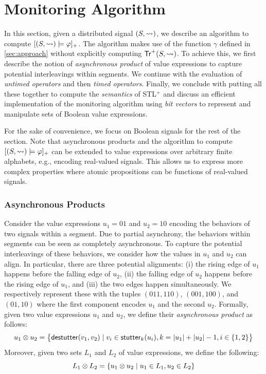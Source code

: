 \section{Monitoring Algorithm} \label{sec:algorithm}
In this section, given a distributed signal $(S,{\rightsquigarrow})$, we describe an algorithm to compute $[(S,{\rightsquigarrow}) \models \varphi]_+$.
The algorithm makes use of the function $\gamma$ defined in \cref{sec:approach} without explicitly computing $\mathsf{Tr}^+(S,{\rightsquigarrow})$.
To achieve this, we first describe the notion of \emph{asynchronous product} of value expressions to capture potential interleavings within segments.
We continue with the evaluation of \emph{untimed operators} and then \emph{timed operators}.
Finally, we conclude with putting all these together to compute the \emph{semantics} of STL$^+$ 
and discuss an efficient implementation of the monitoring algorithm using \emph{bit vectors} to 
represent and manipulate sets of Boolean value expressions.

\begin{remark}
	For the sake of convenience, we focus on Boolean signals for the rest of the section.
	Note that asynchronous products and the algorithm to compute $[(S,{\rightsquigarrow}) \models \varphi]_+$ can be extended to value expressions over arbitrary finite alphabets, e.g., encoding real-valued signals.
	This allows us to express more complex properties where atomic propositions can be functions of real-valued signals.
\end{remark}

\subsubsection{Asynchronous Products}
Consider the value expressions $u_1 = 01$ and $u_2 = 10$ encoding the behaviors of two signals within a segment.
Due to partial asynchrony, the behaviors within segments can be seen as completely asynchronous.
To capture the potential interleavings of these behaviors, we consider how the values in $u_1$ and $u_2$ can align.
In particular, there are three potential alignments:
(i) the rising edge of $u_1$ happens before the falling edge of $u_2$,
(ii) the falling edge of $u_2$ happens before the rising edge of $u_1$, and
(iii) the two edges happen simultaneously.
We respectively represent these with the tuples $(011, 110)$, $(001, 100)$, and $(01, 10)$ where the first component encodes $u_1$ and the second $u_2$.
Formally, given two value expressions $u_1$ and $u_2$, we define their \emph{asynchronous product} as follows:
%
\small
\[ u_1 \otimes u_2 = \big\{ \destutter(v_1, v_2) \st v_i \in \stutter_k(u_i), k = |u_1| + |u_2| - 1, i \in 
\{1,2\} \big\} \]  
\normalsize
Moreover, given two sets $L_1$ and $L_2$ of value expressions, we define the following: 
\small
\[ L_1 \otimes L_2 = \{ u_1 \otimes u_2 \st u_1 \in L_1, u_2 \in L_2 \} \]  
\normalsize

